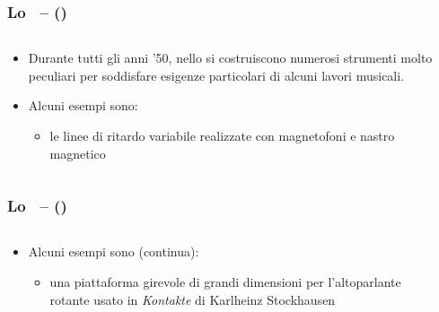 \begin{frame}
    \frametitle{Lo \sem\ -- ()}

    \begin{columns}[T]
        \begin{column}{0.55\textwidth}
			    \begin{itemize}
			
			        \item Durante tutti gli anni '50, nello \sem si costruiscono
			            numerosi strumenti molto peculiari per soddisfare esigenze particolari
			            di alcuni lavori musicali.
			
			        \item Alcuni esempi sono:
			
			        \begin{itemize}
			
			            \item le linee di ritardo variabile realizzate con magnetofoni e nastro magnetico
			
			        \end{itemize}
			
			    \end{itemize}
        \end{column}
        \begin{column}{0.45\textwidth}
        \end{column}
    \end{columns}

\end{frame}

\begin{frame}
    \frametitle{Lo \sem\ -- ()}

    \begin{columns}[T]
        \begin{column}{0.55\textwidth}
			    \begin{itemize}
			
			        \item Alcuni esempi sono (continua):
			
			        \begin{itemize}
			
			            \item una piattaforma girevole di grandi dimensioni
			                per l'altoparlante rotante usato
			                in \emph{Kontakte} di Karlheinz Stockhausen

			        \end{itemize}
          \end{itemize}
       \end{column}
        \begin{column}{0.45\textwidth}
       \end{column}
   \end{columns}

\end{frame}

